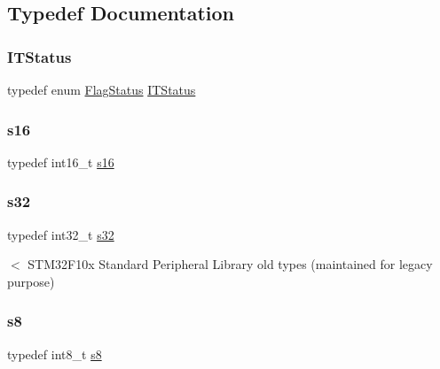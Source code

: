 \subsection{Typedef Documentation}
\mbox{\label{group___exported__types_gaacbd7ed539db0aacd973a0f6eca34074}} 
\subsubsection{\texorpdfstring{ITStatus}{ITStatus}}
{\footnotesize\ttfamily typedef  enum \mbox{\hyperlink{group___exported__types_ga89136caac2e14c55151f527ac02daaff}{Flag\+Status}}  \mbox{\hyperlink{group___exported__types_gaacbd7ed539db0aacd973a0f6eca34074}{I\+T\+Status}}}

\mbox{\label{group___exported__types_gaa980e2c02ba2305e0f489d5650655425}} 
\subsubsection{\texorpdfstring{s16}{s16}}
{\footnotesize\ttfamily typedef int16\+\_\+t \mbox{\hyperlink{group___exported__types_gaa980e2c02ba2305e0f489d5650655425}{s16}}}

\mbox{\label{group___exported__types_gae9b1af5c037e57a98884758875d3a7c4}} 
\subsubsection{\texorpdfstring{s32}{s32}}
{\footnotesize\ttfamily typedef int32\+\_\+t \mbox{\hyperlink{group___exported__types_gae9b1af5c037e57a98884758875d3a7c4}{s32}}}

$<$ S\+T\+M32\+F10x Standard Peripheral Library old types (maintained for legacy purpose) \mbox{\label{group___exported__types_ga9e382f207c65ca13ab4ae98363aeda80}} 
\subsubsection{\texorpdfstring{s8}{s8}}
{\footnotesize\ttfamily typedef int8\+\_\+t \mbox{\hyperlink{group___exported__types_ga9e382f207c65ca13ab4ae98363aeda80}{s8}}}

